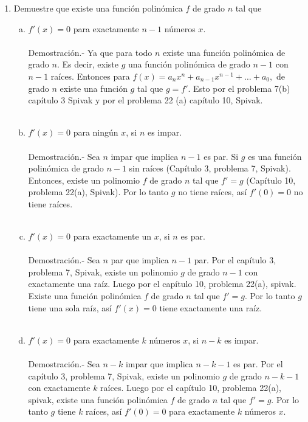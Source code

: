 \begin{enumerate}[\bfseries 1.]
\begin{enumerate}[(a)]
	 \end{enumerate}

     \item Demuestre que existe una función polinómica $f$ de grado $n$ tal que\\
	 \begin{enumerate}[(a)]

	     \item $f'(x)=0$ para exactamente $n-1$ números $x$.\\\\
		 Demostración.-\; Ya que para todo $n$ existe una función polinómica de grado $n$. Es decir, existe $g$ una función polinómica de grado $n-1$ con $n-1$ raíces. Entonces para $f(x)=a_n x^n + a_{n-1} x^{n-1}+\ldots + a_0,$ de grado $n$ existe una función $g$ tal que $g=f'$. Esto por el problema 7(b) capítulo 3 Spivak y por el problema 22 (a) capítulo 10, Spivak.\\\\


	     \item $f'(x)=0$ para ningún $x$, si $n$ es impar.\\\\
		 Demostración.-\; Sea $n$ impar que implica $n-1$ es par. Si $g$ es una función polinómica de grado $n-1$ sin raíces (Capítulo 3, problema 7, Spivak). Entonces, existe un polinomio $f$ de grado $n$ tal que $f'=g$ (Capítulo 10, problema 22(a), Spivak). Por lo tanto $g$ no tiene raíces, así $f'(0)=0$ no tiene raíces.\\\\ 

	     \item $f'(x)=0$ para exactamente un $x$, si $n$ es par.\\\\
		 Demostración.-\; Sea $n$ par que implica $n-1$ par. Por el capítulo 3, problema 7, Spivak, existe un polinomio $g$ de grado $n-1$ con exactamente una raíz. Luego por el capítulo 10, problema 22(a), spivak. Existe una función polinómica $f$ de grado $n$ tal que $f'=g$. Por lo tanto $g$ tiene una sola raíz, así $f'(x)=0$ tiene exactamente una raíz.\\\\

	     \item $f'(x)=0$ para exactamente $k$ números $x$, si $n-k$ es impar.\\\\
		 Demostración.-\; Sea $n-k$ impar que implica $n-k-1$ es par. Por el capítulo 3, problema 7, Spivak, existe un polinomio $g$ de grado $n-k-1$ con exactamente $k$ raíces. Luego por el capítulo 10, problema 22(a), spivak, existe una función polinómica $f$ de grado $n$ tal que $f'=g$. Por lo tanto $g$ tiene $k$ raíces, así $f'(0)=0$ para exactamente $k$ números $x$.\\\\


\end{enumerate}
\end{enumerate}

